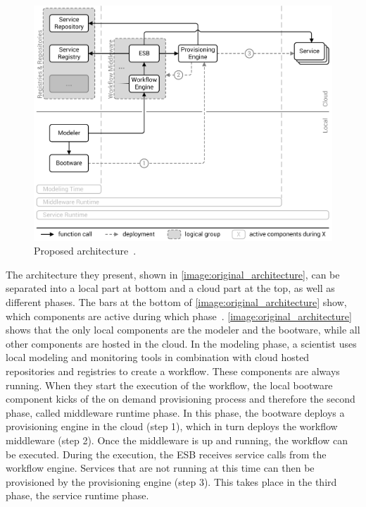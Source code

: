 \begin{figure}[!htbp]
	\centering
	\includegraphics[resolution=600]{previous/assets/original_architecture}
	\caption{Proposed architecture~\autocite[based on][]{provisioning:ondemand}.}
	\label{image:original_architecture}
\end{figure}

The architecture they present, shown in \autoref{image:original_architecture}, can be separated into a local part at bottom and a cloud part at the top, as well as different phases.
The bars at the bottom of \autoref{image:original_architecture} show, which components are active during which phase~\autocite{provisioning:ondemand}.
\autoref{image:original_architecture} shows that the only local components are the modeler and the bootware, while all other components are hosted in the cloud.
In the modeling phase, a scientist uses local modeling and monitoring tools in combination with cloud hosted repositories and registries to create a workflow.
These components are always running.
When they start the execution of the workflow, the local bootware component kicks of the on demand provisioning process and therefore the second phase, called middleware runtime phase.
In this phase, the bootware deploys a provisioning engine in the cloud (step 1), which in turn deploys the workflow middleware (step 2).
Once the middleware is up and running, the workflow can be executed. During the execution, the ESB receives service calls from the workflow engine.
Services that are not running at this time can then be provisioned by the provisioning engine (step 3).
This takes place in the third phase, the service runtime phase.

